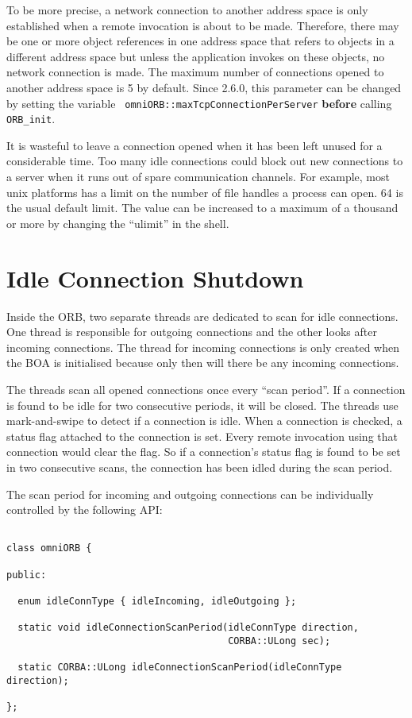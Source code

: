 \documentclass[11pt,twoside,onecolumn]{book}
\begin{document}
To be more precise, a network connection to another address space is only
established when a remote invocation is about to be made. Therefore, there
may be one or more object references in one address space that refers to
objects in a different address space but unless the application invokes on
these objects, no network connection is made. The maximum number of
connections opened to another address space is 5 by default. Since 2.6.0,
this parameter can be changed by setting the variable {\tt
omniORB::maxTcpConnectionPerServer} {\bf before} calling {\tt ORB\_init}.

It is wasteful to leave a connection opened when it has been left unused
for a considerable time. Too many idle connections could block out new
connections to a server when it runs out of spare communication
channels. For example, most unix platforms has a limit on the number of
file handles a process can open. 64 is the usual default limit. The
value can be increased to a maximum of a thousand or more by changing the
``ulimit'' in the shell.

\section{Idle Connection Shutdown}
\label{sec_shut}

Inside the ORB, two separate threads are dedicated to scan for idle
connections. One thread is responsible for outgoing connections and the
other looks after incoming connections. The thread for incoming connections
is only created when the BOA is initialised because only then will there be
any incoming connections.

The threads scan all opened connections once every ``scan period''. If a
connection is found to be idle for two consecutive periods, it will be
closed. The threads use mark-and-swipe to detect if a connection is idle.
When a connection is checked, a status flag attached to the connection is
set. Every remote invocation using that connection would clear the flag. So
if a connection's status flag is found to be set in two consecutive scans,
the connection has been idled during the  scan period.

The scan period for incoming and outgoing connections can be individually
controlled by the following API:

{\small
\begin{verbatim}

class omniORB {

public:

  enum idleConnType { idleIncoming, idleOutgoing };

  static void idleConnectionScanPeriod(idleConnType direction,
                                       CORBA::ULong sec);

  static CORBA::ULong idleConnectionScanPeriod(idleConnType direction);

};

\end{verbatim}
}
\end{document}
